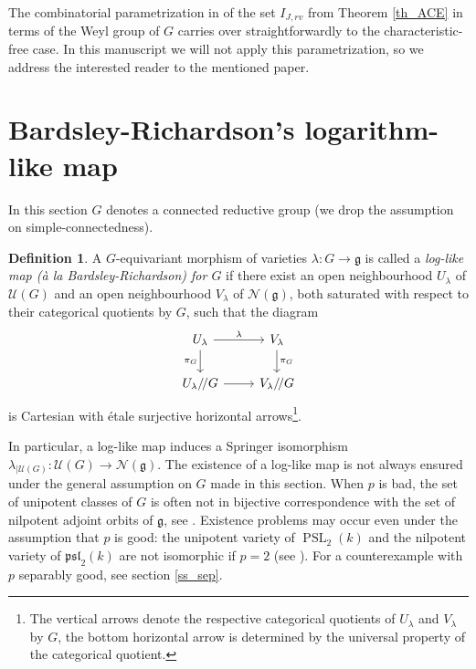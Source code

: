 \documentclass[12pt]{amsart}
\theoremstyle{definition}
\newtheorem{Definition}[Theorem]{Definition}
\theoremstyle{remark}
\newcommand{\g}{\mathfrak{g}}
\newcommand{\N}{\mathcal{N}}
\newcommand{\U}{\mathcal{U}}
\newcommand{\PSL}{\operatorname{PSL}}
\begin{document}
The combinatorial parametrization in \cite[\S 4]{ACE} of the set $I_{J,rv}$ from Theorem \ref{th_ACE} in terms of the Weyl group of $G$ carries over straightforwardly to the characteristic-free case.
In this manuscript we will not apply this parametrization, so we address the interested reader to the mentioned paper.

\section{Bardsley-Richardson's logarithm-like map} \label{s_br}
In this section $G$ denotes a connected reductive group (we drop the assumption on simple-connectedness).

\begin{Definition} \label{def_loglike}
 A $G$-equivariant morphism of varieties $\lambda \colon G \to \g$ 
 is called a \emph{log-like map (\`a la Bardsley-Richardson) for $G$} if 
there exist an open neighbourhood $U_\lambda$ of $\mathcal{U}(G)$ and an open neighbourhood $V_\lambda$ of $\mathcal{N}(\g)$, both saturated with respect to their categorical quotients by $G$, 
such that
the diagram
 \begin{equation} \label{eq_loglikecd}
\begin{tikzcd}
U_\lambda \arrow[d, "\pi_G"']  \arrow[r, "\lambda"] & V_\lambda \arrow[d, "\pi_G"]\\
U_\lambda/\!/ G   \arrow[r] & V_\lambda /\!/ G 
\end{tikzcd}
\end{equation}
is Cartesian with \'etale surjective horizontal arrows\footnote{The vertical arrows denote the respective categorical quotients of $U_\lambda$ and $V_\lambda$ by $G$, the bottom horizontal arrow is determined by the universal property of the categorical quotient.}.
\end{Definition}

In particular, a log-like map induces a Springer isomorphism $\lambda_{\mid \U(G)} \colon \U(G) \to \N(\g)$.
The existence of a log-like map is not always ensured under the general assumption on $G$ made in this section.
When $p$ is bad, the set of unipotent classes of $G$ is often not in  bijective correspondence with the set of nilpotent adjoint orbits of $\g$, see \cite{LiebeckSeitz}.  
Existence problems may occur even under the assumption that $p$ is good: the unipotent variety of $\PSL_2(k)$ and the nilpotent variety of $\mathfrak{psl}_2(k)$ are not isomorphic if $p = 2$ (see  \cite[Appendix]{SobTay}).
For a counterexample with $p$ separably good, see section \ref{ss_sep}.
\end{document}
